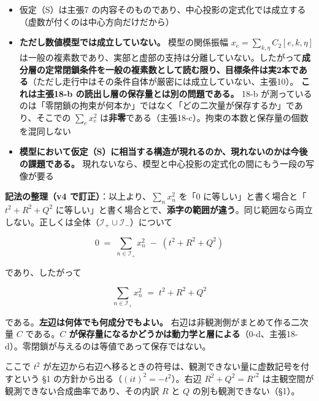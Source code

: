 \documentclass[
  10pt,
]{ltjsarticle}
\providecommand{\tightlist}{%
  \setlength{\itemsep}{0pt}\setlength{\parskip}{0pt}}
\begin{document}
\begin{itemize}
\tightlist
\item
  仮定（S）は主張7
  の内容そのものであり、中心投影の定式化では成立する（虚数が付くのは中心方向だけだから）
\item
  \textbf{ただし数値模型では成立していない。} 模型の関係振幅
  \(x_e = \sum_{k,\eta}C_{2}[e,k,\eta]\)
  は一般の複素数であり、実部と虚部の支持は分離していない。したがって\textbf{成分層の定常閉鎖条件を一般の複素数として読む限り、目標条件は実2本である}（ただし走行中はその条件自体が厳密には成立していない、主張10）。
  \textbf{これは主張18-b の読出し層の保存量とは別の問題である。} 18-b
  が測っているのは「零閉鎖の拘束が何本か」ではなく「どの二次量が保存するか」であり、そこでの
  \(\sum_e x_e^2\)
  は\textbf{非零}である（主張18-c）。拘束の本数と保存量の個数を混同しない
\item
  \textbf{模型において仮定（S）に相当する構造が現れるのか、現れないのかは今後の課題である。}
  現れないなら、模型と中心投影の定式化の間にもう一段の写像が要る
\end{itemize}

\textbf{記法の整理（v4 で訂正）}：以上より、\(\sum_n x_n^2\) を「\(0\)
に等しい」と書く場合と「\(t^2+R^2+Q^2\)
に等しい」と書く場合とで、\textbf{添字の範囲が違う}。同じ範囲なら両立しない。正しくは全体（\(\mathcal{I}_+ \cup \mathcal{I}_-\)）について

\[0 \;=\; \sum_{n \in \mathcal{I}_+}x_n^2 \;-\; \left(t^2 + R^2 + Q^2\right)\]

であり、したがって

\[\boxed{\;\sum_{n \in \mathcal{I}_+} x_n^2 \;=\; t^2 + R^2 + Q^2\;}\]

である。\textbf{左辺は何体でも何成分でもよい。}
右辺は非観測側がまとめて作る二次量 \(C\) である。\textbf{\(C\)
が保存量になるかどうかは動力学と層による}（0-d、主張18-d）。零閉鎖が与えるのは等値であって保存ではない。

ここで \(t^2\)
が左辺から右辺へ移るときの符号は、観測できない量に虚数記号を付すという
§1 の方針から出る（\((it)^2 = -t^2\)）。右辺 \(R^2 + Q^2 = R'^2\)
は主観空間が観測できない合成曲率であり、その内訳 \(R\) と \(Q\)
の別も観測できない（§1）。
\end{document}
